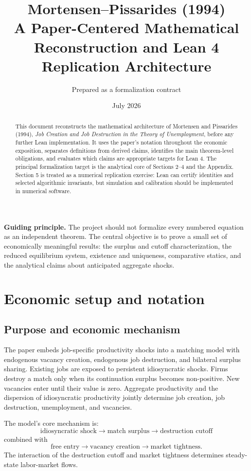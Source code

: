 \documentclass[11pt]{article}
\title{\textbf{Mortensen--Pissarides (1994)}\\
A Paper-Centered Mathematical Reconstruction and Lean 4 Replication Architecture}
\author{Prepared as a formalization contract}
\date{July 2026}
\newcommand{\statusbox}[2]{\colorbox{#1}{\parbox{0.94\linewidth}{#2}}}
\begin{document}
\maketitle

\begin{abstract}
This document reconstructs the mathematical architecture of Mortensen and Pissarides (1994), \emph{Job Creation and Job Destruction in the Theory of Unemployment}, before any further Lean implementation. It uses the paper's notation throughout the economic exposition, separates definitions from derived claims, identifies the main theorem-level obligations, and evaluates which claims are appropriate targets for Lean 4. The principal formalization target is the analytical core of Sections 2--4 and the Appendix. Section 5 is treated as a numerical replication exercise: Lean can certify identities and selected algorithmic invariants, but simulation and calibration should be implemented in numerical software.
\end{abstract}

\statusbox{softblue}{\textbf{Guiding principle.} The project should not formalize every numbered equation as an independent theorem. The central objective is to prove a small set of economically meaningful results: the surplus and cutoff characterization, the reduced equilibrium system, existence and uniqueness, comparative statics, and the analytical claims about anticipated aggregate shocks.}

\tableofcontents
\newpage

\section{Economic setup and notation}

\subsection{Purpose and economic mechanism}
The paper embeds job-specific productivity shocks into a matching model with endogenous vacancy creation, endogenous job destruction, and bilateral surplus sharing. Existing jobs are exposed to persistent idiosyncratic shocks. Firms destroy a match only when its continuation surplus becomes non-positive. New vacancies enter until their value is zero. Aggregate productivity and the dispersion of idiosyncratic productivity jointly determine job creation, job destruction, unemployment, and vacancies.

The model's core mechanism is:
\[
\text{idiosyncratic shock} \longrightarrow \text{match surplus} \longrightarrow \text{destruction cutoff}
\]
combined with
\[
\text{free entry} \longrightarrow \text{vacancy creation} \longrightarrow \text{market tightness}.
\]
The interaction of the destruction cutoff and market tightness determines steady-state labor-market flows.
\end{document}
